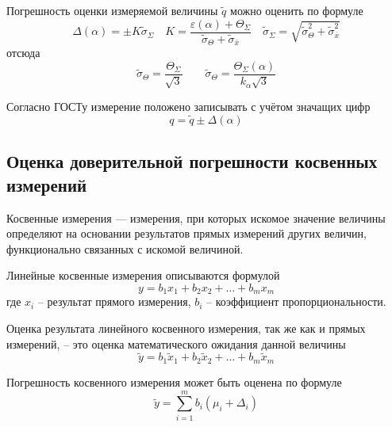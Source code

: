 \documentclass[12pt,a4paper]{article}
\begin{document}
Погрешность оценки измеряемой величины $\tilde{q}$ можно оценить по формуле
\begin{equation}
  \Delta(\alpha) = \pm K\tilde{\sigma}_\Sigma \quad K = \frac{\varepsilon(\alpha) + \Theta_\Sigma}{\tilde{\sigma}_\Theta + \tilde{\sigma}_{\overline{x}}} \quad \tilde{\sigma}_\Sigma = \sqrt{\tilde{\sigma}_\Theta^2 + \tilde{\sigma}_{\overline{x}}^2}
  \tag{4.6}
  \label{delta:confidence}
\end{equation}
отсюда 
\begin{equation*}
  \tilde{\sigma}_\Theta = \frac{\Theta_\Sigma}{\sqrt{3}} \qquad \tilde{\sigma}_\Theta = \frac{\Theta_\Sigma(\alpha)}{k_\alpha\sqrt{3}}
\end{equation*}

Согласно ГОСТу измерение положено записывать с учётом значащих цифр
\begin{equation}
  q = \tilde{q} \pm \Delta(\alpha) 
  \tag{4.7}
  \label{final:result}
\end{equation}

\subsection{Оценка доверительной погрешности косвенных измерений}

Косвенные измерения — измерения, при которых искомое значение
величины определяют на основании результатов прямых измерений
других величин, функционально связанных с искомой величиной.

Линейные косвенные измерения описываются формулой
\begin{equation}
  y = b_1 x_1 + b_2 x_2 + \ldots + b_m x_m
  \tag{5.1}
  \label{linear:indirect}
\end{equation}
где $x_i$ – результат прямого измерения, $b_i$ – коэффициент пропорциональности.

Оценка результата линейного косвенного измерения, так же как и
прямых измерений, – это оценка математического ожидания данной
величины
\begin{equation*}
  \tilde{y} = b_1 \tilde{x}_1 + b_2 \tilde{x}_2 + \ldots + b_m \tilde{x}_m
  \tag{5.2}
  \label{linear:indirect:result}
\end{equation*}

Погрешность косвенного измерения может быть оценена по формуле
\begin{equation*}
  \tilde{y} = \sum_{i=1}^{m} b_i (\mu_i + \Delta_i)
\end{equation*}
\end{document}

